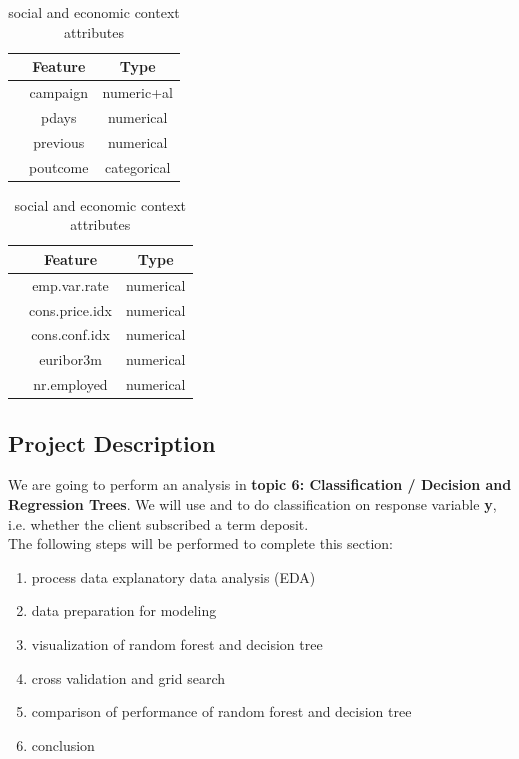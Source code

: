 \documentclass[11pt,a4paper]{article}
\newcounter{magicrownumbers}
\newcommand\rownumber{\stepcounter{magicrownumbers}\arabic{magicrownumbers}}
\begin{document}
    \begin{table}[h]
        \begin{minipage}{.5\linewidth}
            \centering
            \begin{tabular}{r c c}
                 & Feature & Type \\
                \hline \hline
                \rownumber & campaign & numeric+al \\
                \rownumber & pdays & numerical \\
                \rownumber & previous & numerical \\
                \rownumber & poutcome & categorical \\
            \end{tabular}
            \caption{Other attributes}\label{tab:other}
        \end{minipage}%
        \begin{minipage}{.5\linewidth}
            \centering
            \begin{tabular}{r c c}
                 & Feature & Type \\
                \hline \hline
                \rownumber & emp.var.rate & numerical \\
                \rownumber & cons.price.idx & numerical \\
                \rownumber & cons.conf.idx & numerical \\
                \rownumber & euribor3m & numerical \\
                \rownumber & nr.employed & numerical \\
            \end{tabular}
            \caption{social and economic context attributes}\label{tab:soc.econ}
        \end{minipage}
    \end{table}
    
    \newpage
    \subsection{Project Description}
    We are going to perform an analysis in \textbf{topic 6: Classification / Decision and Regression Trees}. We will use  and  to do classification on response variable \textbf{y}, i.e. whether the client subscribed a term deposit. \\
    
    
    \noindent
    The following steps will be performed to complete this section:
    \begin{enumerate}
        \item process data explanatory data analysis (EDA)
        \item data preparation for modeling
        \item visualization of random forest and decision tree
        \item cross validation and grid search
        \item comparison of performance of random forest and decision tree
        \item conclusion
    \end{enumerate}
    
\end{document}
